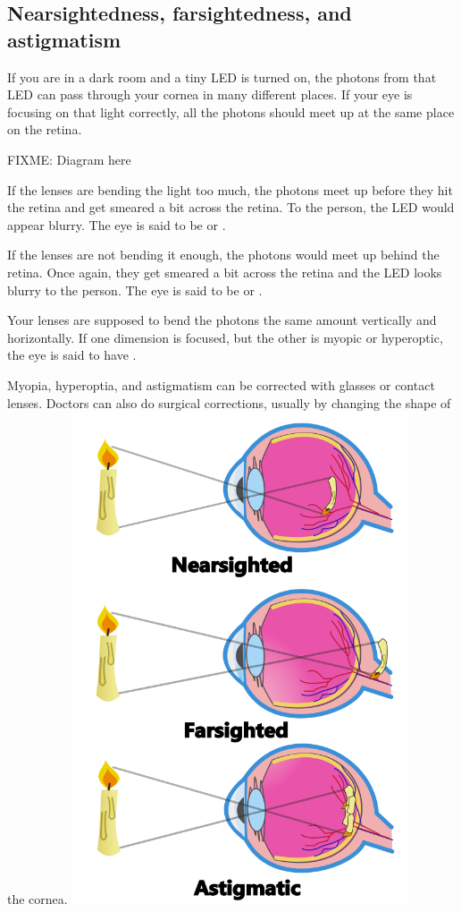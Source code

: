 \subsection{Nearsightedness, farsightedness, and astigmatism}

If you are in a dark room and a tiny LED is turned on, the photons
from that LED can pass through your cornea in many different places.
If your eye is focusing on that light correctly, all the photons
should meet up at the same place on the retina.

FIXME: Diagram here

If the lenses are bending the light too much, the photons meet up before they hit the
retina and get smeared a bit across the retina. To the person, the LED
would appear blurry. The eye is said to be  or
.

If the lenses are not bending it enough, the photons would meet up
behind the retina.  Once again, they get smeared a bit across the
retina and the LED looks blurry to the person. The eye is said to be
 or .

Your lenses are supposed to bend the photons the same amount
vertically and horizontally. If one dimension is focused, but the
other is myopic or hyperoptic, the eye is said to have .

Myopia, hyperoptia, and astigmatism can be corrected with glasses or contact
lenses. Doctors can also do surgical corrections, usually by changing
the shape of the cornea.
\includegraphics[width=0.75\textwidth]{Eye_Probs.png}

